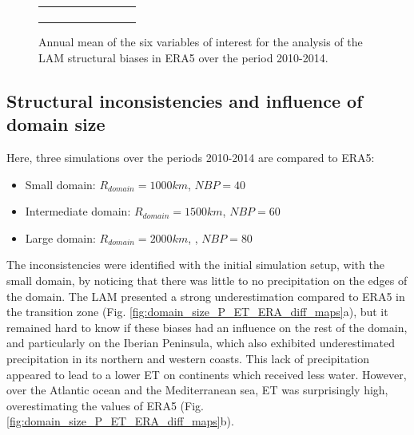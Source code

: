 \begin{figure}[htbp]
\begin{tabular}{ccc}
\begin{subfigure}[b]{0.33\textwidth}
        \end{subfigure}
    \end{tabular}
    \caption{Annual mean of the six variables of interest for the analysis of the LAM structural biases in ERA5 over the period 2010-2014.}
    \label{fig:ERA_var_maps}
\end{figure}

\subsection{Structural inconsistencies and influence of domain size}
\label{sec:domain_size}
Here, three simulations over the periods 2010-2014 are compared to ERA5:
\begin{itemize}
    \item Small domain: $R_{domain} = 1000 km$, $NBP=40$
    \item Intermediate domain: $R_{domain} = 1500 km$, $NBP=60$
    \item Large domain: $R_{domain} = 2000 km$, , $NBP=80$
\end{itemize}

The inconsistencies were identified with the initial simulation setup, with the small domain, by noticing that there was little to no precipitation on the edges of the domain. The LAM presented a strong underestimation compared to ERA5 in the transition zone (Fig. \ref{fig:domain_size_P_ET_ERA_diff_maps}a), but it remained hard to know if these biases had an influence on the rest of the domain, and particularly on the Iberian Peninsula, which also exhibited underestimated precipitation in its northern and western coasts.
This lack of precipitation appeared to lead to a lower ET on continents which received less water. However, over the Atlantic ocean and the Mediterranean sea, ET was surprisingly high, overestimating the values of ERA5 (Fig. \ref{fig:domain_size_P_ET_ERA_diff_maps}b). 

